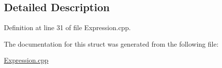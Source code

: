 \subsection{Detailed Description}


Definition at line 31 of file Expression.\+cpp.



The documentation for this struct was generated from the following file\+:\begin{DoxyCompactItemize}
\item 
\hyperlink{_expression_8cpp}{Expression.\+cpp}\end{DoxyCompactItemize}
